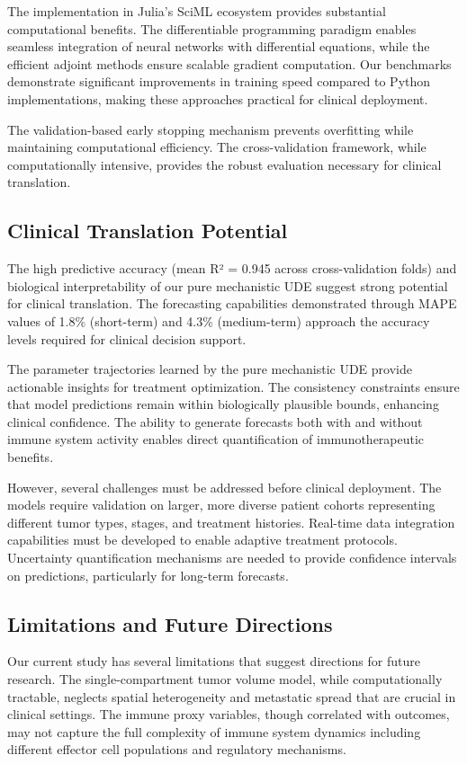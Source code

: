 \documentclass{juliacon}
\begin{document}
The implementation in Julia's SciML ecosystem provides substantial computational benefits. The differentiable programming paradigm enables seamless integration of neural networks with differential equations, while the efficient adjoint methods ensure scalable gradient computation. Our benchmarks demonstrate significant improvements in training speed compared to Python implementations, making these approaches practical for clinical deployment.

The validation-based early stopping mechanism prevents overfitting while maintaining computational efficiency. The cross-validation framework, while computationally intensive, provides the robust evaluation necessary for clinical translation.

\subsection{Clinical Translation Potential}

The high predictive accuracy (mean R² = 0.945 across cross-validation folds) and biological interpretability of our pure mechanistic UDE suggest strong potential for clinical translation. The forecasting capabilities demonstrated through MAPE values of 1.8\% (short-term) and 4.3\% (medium-term) approach the accuracy levels required for clinical decision support.

The parameter trajectories learned by the pure mechanistic UDE provide actionable insights for treatment optimization. The consistency constraints ensure that model predictions remain within biologically plausible bounds, enhancing clinical confidence. The ability to generate forecasts both with and without immune system activity enables direct quantification of immunotherapeutic benefits.

However, several challenges must be addressed before clinical deployment. The models require validation on larger, more diverse patient cohorts representing different tumor types, stages, and treatment histories. Real-time data integration capabilities must be developed to enable adaptive treatment protocols. Uncertainty quantification mechanisms are needed to provide confidence intervals on predictions, particularly for long-term forecasts.

\subsection{Limitations and Future Directions}

Our current study has several limitations that suggest directions for future research. The single-compartment tumor volume model, while computationally tractable, neglects spatial heterogeneity and metastatic spread that are crucial in clinical settings. The immune proxy variables, though correlated with outcomes, may not capture the full complexity of immune system dynamics including different effector cell populations and regulatory mechanisms.
\end{document}
